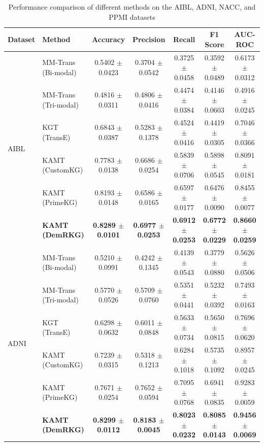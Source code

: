 \documentclass[lettersize,journal]{IEEEtran}
\begin{document}
\begin{table}[htbp]
\centering
\caption{Performance comparison of different methods on the AIBL, ADNI, NACC, and PPMI datasets}
\label{tab:performance_comparison}
\renewcommand{\arraystretch}{1.3} %
\begin{tabular}{llccccc}
\toprule
\textbf{Dataset} & \textbf{Method} & \textbf{Accuracy} & \textbf{Precision} & \textbf{Recall} & \textbf{F1 Score} & \textbf{AUC-ROC} \\
\midrule
\multirow{6}{*}{AIBL} 
& MM-Trans (Bi-modal)  & 0.5402 $\pm$ 0.0423 & 0.3704 $\pm$ 0.0542 & 0.3725 $\pm$ 0.0458 & 0.3592 $\pm$ 0.0489 & 0.6173 $\pm$ 0.0312 \\
& MM-Trans (Tri-modal) & 0.4816 $\pm$ 0.0311 & 0.4806 $\pm$ 0.0416 & 0.4474 $\pm$ 0.0384 & 0.4146 $\pm$ 0.0603 & 0.4916 $\pm$ 0.0245 \\
& KGT (TransE)         & 0.6843 $\pm$ 0.0387 & 0.5283 $\pm$ 0.1378 & 0.4524 $\pm$ 0.0416 & 0.4419 $\pm$ 0.0305 & 0.7046 $\pm$ 0.0366 \\
& KAMT (CustomKG)      & 0.7783 $\pm$ 0.0138 & 0.6686 $\pm$ 0.0254 & 0.5839 $\pm$ 0.0706 & 0.5898 $\pm$ 0.0545 & 0.8091 $\pm$ 0.0181 \\
& KAMT (PrimeKG)       & 0.8193 $\pm$ 0.0148 & 0.6586 $\pm$ 0.0165 & 0.6597 $\pm$ 0.0177 & 0.6476 $\pm$ 0.0090 & 0.8455 $\pm$ 0.0077 \\
& \textbf{KAMT (DemRKG)} & \textbf{0.8289 $\pm$ 0.0101} & \textbf{0.6977 $\pm$ 0.0253} & \textbf{0.6912 $\pm$ 0.0253} & \textbf{0.6772 $\pm$ 0.0229} & \textbf{0.8660 $\pm$ 0.0259} \\
\midrule
\multirow{6}{*}{ADNI} 
& MM-Trans (Bi-modal)  & 0.5210 $\pm$ 0.0991 & 0.4242 $\pm$ 0.1345 & 0.4139 $\pm$ 0.0543 & 0.3779 $\pm$ 0.0880 & 0.5626 $\pm$ 0.0506 \\
& MM-Trans (Tri-modal) & 0.5770 $\pm$ 0.0526 & 0.5709 $\pm$ 0.0760 & 0.5351 $\pm$ 0.0441 & 0.5232 $\pm$ 0.0392 & 0.7493 $\pm$ 0.0163 \\
& KGT (TransE)         & 0.6298 $\pm$ 0.0632 & 0.6011 $\pm$ 0.0848 & 0.5633 $\pm$ 0.0734 & 0.5650 $\pm$ 0.0815 & 0.7696 $\pm$ 0.0620 \\
& KAMT (CustomKG)      & 0.7239 $\pm$ 0.0315 & 0.5318 $\pm$ 0.1213 & 0.6284 $\pm$ 0.1018 & 0.5735 $\pm$ 0.1092 & 0.8957 $\pm$ 0.0245 \\
& KAMT (PrimeKG)       & 0.7671 $\pm$ 0.0254 & 0.7652 $\pm$ 0.0594 & 0.7095 $\pm$ 0.0768 & 0.6941 $\pm$ 0.0835 & 0.9283 $\pm$ 0.0059 \\
& \textbf{KAMT (DemRKG)} & \textbf{0.8299 $\pm$ 0.0112} & \textbf{0.8183 $\pm$ 0.0045} & \textbf{0.8023 $\pm$ 0.0232} & \textbf{0.8085 $\pm$ 0.0143} & \textbf{0.9456 $\pm$ 0.0069} \\

\end{tabular}
\end{table}
\end{document}
